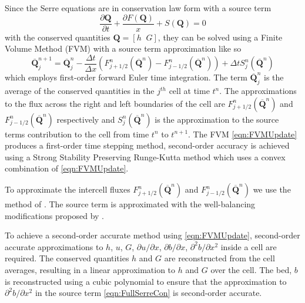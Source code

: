 \documentclass[times]{elsarticle}
\newcommand{\vecn}[1]{\boldsymbol{#1}}
\begin{document}
Since the Serre equations are in conservation law form with a source term
\begin{equation*}
\frac{\partial \vecn{Q} }{\partial t} + \frac{\partial F(\vecn{Q} )}{x} + S(\vecn{Q} ) = 0
\end{equation*}
with the conserved quantities $\vecn{Q}  = \left[h \; \; G\right]$, they can be solved using a Finite Volume Method (FVM) with a source term approximation like so
\begin{equation}
\label{eqn:FVMUpdate}
\overline{\vecn{Q} }^{n+1}_j = \overline{\vecn{Q} }^{n}_j - \frac{\Delta t}{\Delta x} \left(F^n_{j+1/2}\left(\overline{\vecn{Q} }^{n} \right) - F^n_{j-1/2}\left(\overline{\vecn{Q} }^{n} \right) \right) + \Delta t S^n_j\left(\overline{\vecn{Q} }^{n} \right)
\end{equation}
which employs first-order forward Euler time integration. The term $\overline{\vecn{Q} }^{n}_j $ is the average of the conserved quantities in the $j^{th}$ cell at time $t^n$. The approximations to the flux across the right and left boundaries of the cell are $F^n_{j+1/2}\left(\overline{\vecn{Q} }^{n} \right)$ and $ F^n_{j-1/2}\left(\overline{\vecn{Q} }^{n} \right)$ respectively and $S^n_j\left(\overline{\vecn{Q} }^{n} \right)$ is the approximation to the source terms contribution to the cell from time $t^n$ to $t^{n+1}$. The FVM \eqref{eqn:FVMUpdate} produces a first-order time stepping method, second-order accuracy is achieved using a Strong Stability Preserving Runge-Kutta method \cite{Gottlieb-etal-2003-89} which uses a convex combination of \eqref{eqn:FVMUpdate}.

To approximate the intercell fluxes $F^n_{j+1/2}\left(\overline{\vecn{Q} }^{n} \right)$ and $F^n_{j-1/2}\left(\overline{\vecn{Q} }^{n} \right)$ we use the method of \citet{Kurganov-etal-2001-707}. The source term is approximated with the well-balancing modifications proposed by \citet{Klein-etal-2004-2050}.

To achieve a second-order accurate method using \eqref{eqn:FVMUpdate}, second-order accurate approximations to $h$, $u$, $G$, $\partial u / \partial x$, $\partial b / \partial x$, $\partial^2 b / \partial x^2$ inside a cell are required. The conserved quantities $h$ and $G$ are reconstructed from the cell averages, resulting in a linear approximation to $h$ and $G$ over the cell. The bed, $b$ is reconstructed using a cubic polynomial to ensure that the approximation to $\partial^2 b / \partial x^2$ in the source term \eqref{eqn:FullSerreCon} is second-order accurate.
\end{document}
